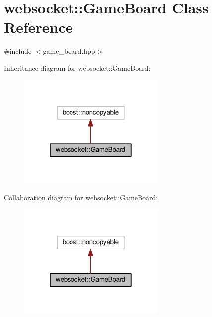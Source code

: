 \hypertarget{classwebsocket_1_1GameBoard}{}\section{websocket\+:\+:Game\+Board Class Reference}
\label{classwebsocket_1_1GameBoard}


{\ttfamily \#include $<$game\+\_\+board.\+hpp$>$}



Inheritance diagram for websocket\+:\+:Game\+Board\+:
\nopagebreak
\begin{figure}[H]
\begin{center}
\leavevmode
\includegraphics[width=202pt]{classwebsocket_1_1GameBoard__inherit__graph}
\end{center}
\end{figure}


Collaboration diagram for websocket\+:\+:Game\+Board\+:
\nopagebreak
\begin{figure}[H]
\begin{center}
\leavevmode
\includegraphics[width=202pt]{classwebsocket_1_1GameBoard__coll__graph}
\end{center}
\end{figure}
